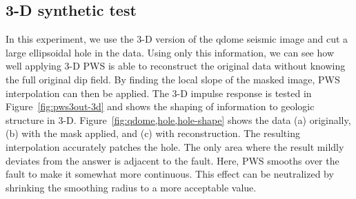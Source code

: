 
\subsection{3-D synthetic test}

In this experiment, we use the 3-D version of the qdome seismic image and cut a large ellipsoidal hole in the data. Using only this information, we can see how well applying 3-D PWS is able to reconstruct the original data without knowing the full original dip field. By finding the local slope of the masked image, PWS interpolation can then be applied. The 3-D impulse response is tested in Figure~\ref{fig:pws3out-3d} and shows the shaping of information to geologic structure in 3-D. Figure~\ref{fig:qdome,hole,hole-shape} shows the data (a) originally, (b) with the mask applied, and (c) with reconstruction. The resulting interpolation accurately patches the hole. The only area where the result mildly deviates from the answer is adjacent to the fault. Here, PWS smooths over the fault to make it somewhat more continuous. This effect can be neutralized by shrinking the smoothing radius to a more acceptable value.


